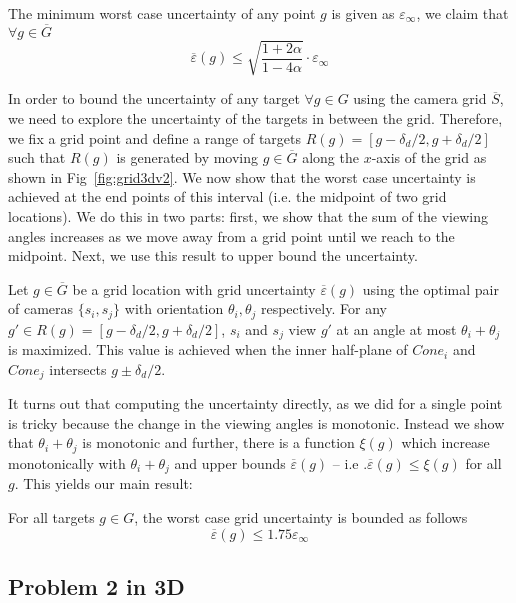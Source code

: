 \begin{lemma}\label{lem:gridu}
The minimum worst case uncertainty of any point $g$ is given as $\varepsilon_\infty$,
we claim that $\forall g \in \overline{G}$
$$
\overline{\varepsilon}(g) \leq \sqrt{\frac{1+2\alpha}{1-4\alpha}} \cdot \varepsilon_\infty
$$ 
\end{lemma}

In order to bound the uncertainty of any target $\forall g \in G$ using the camera grid $\overline{S}$, we need to explore the uncertainty of the targets in between the grid. Therefore, we fix a grid point and define a range of targets $R(g) = [g-\delta_d/2, g+\delta_d/2]$ such that $R(g)$ is generated by moving $g \in \overline{G}$ along the $x$-axis of the grid as shown in Fig~\ref{fig:grid3dv2}. We now show that the worst case uncertainty is achieved at the end points of this interval (i.e. the midpoint of two grid locations). We do this in two parts: first, we show that the sum of the viewing angles increases as we move away from a grid point until we reach to the midpoint. Next, we use this result to upper bound the uncertainty. 

\begin{lemma}\label{lem:maxtheta}
Let $g \in \overline{G}$ be a grid location with grid uncertainty $\overline{\varepsilon}(g)$ using the optimal pair of cameras $\{s_i,s_j\}$ with orientation $\theta_i,\theta_j$ respectively.  For any $g' \in R(g) = [g-\delta_d/2, g+\delta_d/2]$, 
$s_i$ and $s_j$ view $g'$ at an angle at most $\theta_i + \theta_j$ is maximized. This value is achieved when the inner half-plane of $Cone_i$ and $Cone_j$ intersects $g \pm \delta_d/2$.
\end{lemma}

It turns out that computing the uncertainty directly, as we did for a single point is tricky because the change in the viewing angles is monotonic.
Instead we show that $\theta_i+\theta_j$ is monotonic and further, there is a function $\xi(g)$ which increase monotonically with $\theta_i+\theta_j$ and upper bounds $\overline{\varepsilon}(g)$ -- i.e .$\overline{\varepsilon}(g) \leq \xi(g)$ for all $g$. This yields our main result:

\begin{theorem}\label{thrm:grid3d1}
For all targets $g \in G$, the worst case grid uncertainty is bounded as follows
$$
\overline{\varepsilon}(g) \leqslant 1.75 \varepsilon_\infty
$$
\end{theorem}

\subsection{Problem 2 in 3D}

